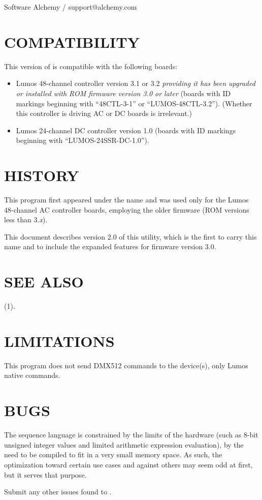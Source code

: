 Software Alchemy / support@alchemy.com
\section*{COMPATIBILITY}


This version of 
is compatible with the following boards:
\begin{itemize}
\item
Lumos 48-channel controller version 3.1 or 3.2
\emph{providing it has been upgraded or installed with ROM firmware version 3.0 or later}
(boards with ID markings beginning with ``48CTL-3-1'' or ``LUMOS-48CTL-3.2'').  (Whether this controller is
driving AC or DC boards is irrelevant.)
\item
Lumos 24-channel DC controller version 1.0 (boards with ID markings beginning with
``LUMOS-24SSR-DC-1.0'').
\end{itemize}
\section*{HISTORY}



This program first appeared under the name
and was used only for the Lumos 48-channel AC controller boards, employing the
older firmware (ROM versions less than
3.\emph{x}).


This document describes version 2.0 of this utility, which is the first to carry
this name and to include the expanded features for firmware version 3.0.
\section*{SEE ALSO}
(1).
\section*{LIMITATIONS}


This program does not send DMX512 commands to the device(s), only Lumos native
commands.
\section*{BUGS}


The sequence language is constrained by the limits of the hardware (such as 8-bit
unsigned integer values and limited arithmetic expression evaluation), 
by the need to 
be compiled to fit in a very small memory space.  As such, the optimization
toward certain use cases and against others may seem odd at first, but it serves that
purpose.


Submit any other issues found to 
.
